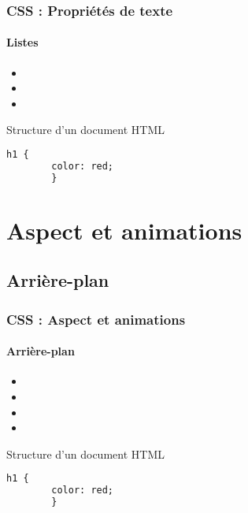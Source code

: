 \documentclass[xcolor=table]{beamer}
\begin{document}
\begin{frame}[fragile]
\frametitle{CSS : Propriétés de texte}
\framesubtitle{Listes}

\begin{minipage}{0.60\textwidth}
	\begin{itemize}
		\item {}
		\item {}
		\item {}
	\end{itemize}
\end{minipage}
%
\begin{minipage}{0.38\textwidth}
	\begin{block}{Structure d'un document HTML}
		\lstset{escapeinside=**}
		\scriptsize\bfseries
		\begin{lstlisting}[language={html}]
		h1 {
		color: red;
		}
		\end{lstlisting}
	\end{block}
\end{minipage}
\end{frame}

\section{Aspect et animations}

\subsection{Arrière-plan}

\begin{frame}[fragile]
\frametitle{CSS : Aspect et animations}
\framesubtitle{Arrière-plan}

\begin{minipage}{0.60\textwidth}
	\begin{itemize}
		\item {}
		\item {}
		\item {}
		\item {}
	\end{itemize}
\end{minipage}
%
\begin{minipage}{0.38\textwidth}
	\begin{block}{Structure d'un document HTML}
		\lstset{escapeinside=**}
		\scriptsize\bfseries
		\begin{lstlisting}[language={html}]
		h1 {
		color: red;
		}
		\end{lstlisting}
	\end{block}
\end{minipage}
\end{frame}
\end{document}
